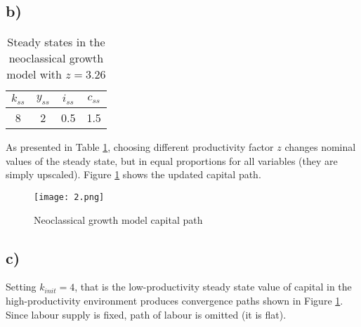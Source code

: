 \documentclass{article}
\begin{document}
\subsection*{b)}

\begin{table}
    \centering
    \begin{tabular}{c|c|c|c}
         $k_{ss}$ & $y_{ss}$ & $i_{ss}$ & $c_{ss}$  \\
         \hline
         8 & 2 & 0.5 & 1.5 
    \end{tabular}
    \caption{Steady states in the neoclassical growth model with $z=3.26$}
    \label{tab2}
\end{table}

As presented in Table \ref{tab2}, choosing different productivity factor $z$ changes nominal values of the steady state, but in equal proportions for all variables (they are simply upscaled). Figure \ref{fig2} shows the updated capital path.

\begin{figure}[p]
    \centering
    \texttt{[image: 2.png]}
    \caption{Neoclassical growth model capital path}
    \label{fig2}
\end{figure}

\subsection*{c)}

Setting $k_{init}=4$, that is the low-productivity steady state value of capital in the high-productivity environment produces convergence paths shown in Figure \ref{tab2}. Since labour supply is fixed, path of labour is omitted (it is flat).

    
\end{document}
